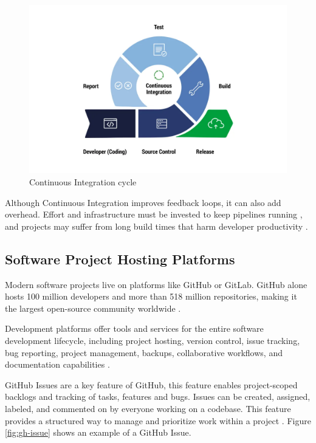 \begin{figure}[H]
    \centering
    \includegraphics[width=1\textwidth]{images/ci-cycle.png}
    \caption{Continuous Integration cycle}
    \label{fig:ci-cycle}
\end{figure}

Although Continuous Integration improves feedback loops, it can also add overhead. Effort and infrastructure must be invested to keep pipelines running \cite{hiltonUsageCostsBenefits2016}, and projects may suffer from long build times that harm developer productivity \cite{ghalebEmpiricalStudyLong2019}.

\subsection{Software Project Hosting Platforms} \label{subsection:Software Project Hosting Platforms}

Modern software projects live on platforms like GitHub or GitLab. GitHub alone hosts 100 million developers and more than 518 million repositories, making it the largest open-source community worldwide \cite{staffOctoverseAILeads2024}.

Development platforms offer tools and services for the entire software development lifecycle, including project hosting, version control, issue tracking, bug reporting, project management, backups, collaborative workflows, and documentation capabilities \cite{GitHubFeatures2025, abrahamssonAgileSoftwareDevelopment2017}.

GitHub Issues are a key feature of GitHub, this feature enables project-scoped backlogs and tracking of tasks, features and bugs. Issues can be created, assigned, labeled, and commented on by everyone working on a codebase. This feature provides a structured way to manage and prioritize work within a project \cite{Issues}. Figure \ref{fig:gh-issue} shows an example of a GitHub Issue.

